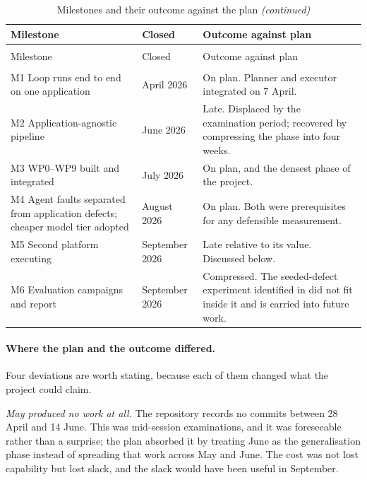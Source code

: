 \begingroup
\small
\begin{xltabular}{\textwidth}{@{}>{\hsize}Y>{\hsize}Y>{\hsize}Y@{}}
  \caption{Milestones and their outcome against the plan}
  \label{tab:milestones}\\
  \toprule
  Milestone & Closed & Outcome against plan \\
  \midrule
  \endfirsthead
  \caption[]{Milestones and their outcome against the plan \emph{(continued)}}\\
  \toprule
  Milestone & Closed & Outcome against plan \\
  \midrule
  \endhead
  \midrule
  \\
  \endfoot
  \bottomrule
  \endlastfoot

  M1 Loop runs end to end on one application & April 2026 & On plan. Planner and executor integrated on 7 April. \\
  \addlinespace
  M2 Application-agnostic pipeline & June 2026 & Late. Displaced by the examination period; recovered by compressing the phase into four weeks. \\
  \addlinespace
  M3 WP0--WP9 built and integrated & July 2026 & On plan, and the densest phase of the project. \\
  \addlinespace
  M4 Agent faults separated from application defects; cheaper model tier adopted & August 2026 & On plan. Both were prerequisites for any defensible measurement. \\
  \addlinespace
  M5 Second platform executing & September 2026 & Late relative to its value. Discussed below. \\
  \addlinespace
  M6 Evaluation campaigns and report & September 2026 & Compressed. The seeded-defect experiment identified in  did not fit inside it and is carried into future work. \\
  \bottomrule
\end{xltabular}
\endgroup

\paragraph{Where the plan and the outcome differed.} Four deviations are worth
stating, because each of them changed what the project could claim.

\emph{May produced no work at all.} The repository records no commits between
28 April and 14 June. This was mid-session examinations, and it was foreseeable
rather than a surprise; the plan absorbed it by treating June as the
generalisation phase instead of spreading that work across May and June. The
cost was not lost capability but lost slack, and the slack would have been
useful in September.

